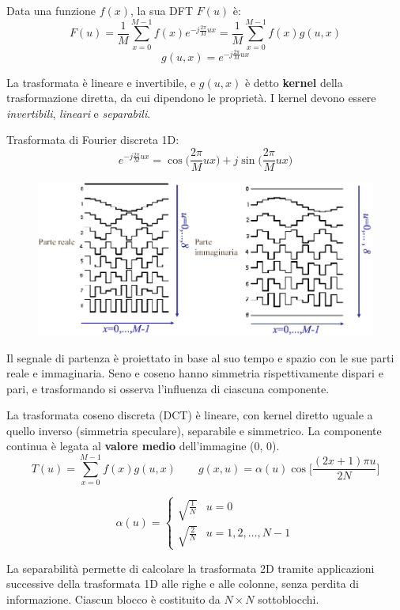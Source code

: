 Data una funzione $f(x)$, la sua DFT $F(u)$ è:
$$F(u) = \frac{1}{M} \sum_{x=0}^{M- 1}f(x)e^{-j\frac{2\pi}{M}ux} = \frac{1}{M} \sum_{x=0}^{M- 1}f(x)g(u, x)$$
$$g(u, x) = e^{-j\frac{2\pi}{M}ux}$$

La trasformata è lineare e invertibile, e $g(u, x)$ è detto \textbf{kernel} della trasformazione diretta, da cui dipendono le proprietà. I kernel devono essere \textit{invertibili}, \textit{lineari} e \textit{separabili}.

Trasformata di Fourier discreta 1D:
$$e^{-j\frac{2\pi}{M}ux} = \cos\big(\frac{2\pi}{M}ux\big) + j\sin\big(\frac{2\pi}{M}ux\big)$$

\begin{figure}[h]
	\centering
	\includegraphics[scale=0.48]{Lezioni/Immagini/ondequadrate}
\end{figure}

Il segnale di partenza è proiettato in base al suo tempo e spazio con le sue parti reale e immaginaria. Seno e coseno hanno simmetria rispettivamente dispari e pari, e trasformando si osserva l'influenza di ciascuna componente. 

La trasformata coseno discreta (DCT) è lineare, con kernel diretto uguale a quello inverso (simmetria speculare), separabile e simmetrico. La componente continua è legata al \textbf{valore medio} dell'immagine (0, 0). 
$$T(u) = \sum_{x=0}^{M- 1}f(x)g(u, x) \qquad g(x, u) = \alpha(u) \cos\Big[\frac{(2x + 1)\pi u}{2N}\Big]$$

$$\alpha(u) = \begin{cases}
\sqrt{\frac{1}{N}} & u = 0 \\
\sqrt{\frac{2}{N}} & u = 1, 2, \dots, N - 1^{}
\end{cases}$$

La separabilità permette di calcolare la trasformata 2D tramite applicazioni successive della trasformata 1D alle righe e alle colonne, senza perdita di informazione. Ciascun blocco è costituito da $N \times N$ sottoblocchi.

